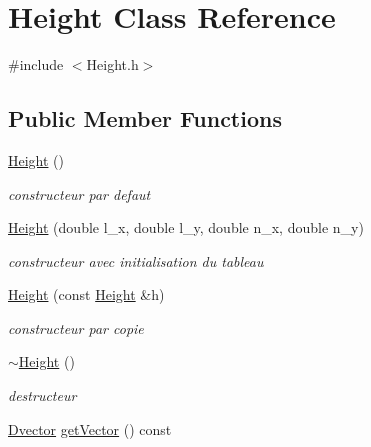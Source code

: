 \hypertarget{classHeight}{\section{Height Class Reference}
\label{classHeight}
}


{\ttfamily \#include $<$Height.\-h$>$}

\subsection*{Public Member Functions}
\begin{DoxyCompactItemize}
\item 
\hypertarget{classHeight_a7fecf5018a116f8234513b222bae6a2f}{\hyperlink{classHeight_a7fecf5018a116f8234513b222bae6a2f}{Height} ()}\label{classHeight_a7fecf5018a116f8234513b222bae6a2f}

\begin{DoxyCompactList}\small\item\em constructeur par defaut \end{DoxyCompactList}\item 
\hyperlink{classHeight_afef85fd5b8127c4bb4f27e05a4c869fe}{Height} (double l\-\_\-x, double l\-\_\-y, double n\-\_\-x, double n\-\_\-y)
\begin{DoxyCompactList}\small\item\em constructeur avec initialisation du tableau \end{DoxyCompactList}\item 
\hyperlink{classHeight_a2a357c8260db561016f559851ba3b831}{Height} (const \hyperlink{classHeight}{Height} \&h)
\begin{DoxyCompactList}\small\item\em constructeur par copie \end{DoxyCompactList}\item 
\hypertarget{classHeight_a93e56f89aa752196cc73ef5be717f386}{\hyperlink{classHeight_a93e56f89aa752196cc73ef5be717f386}{$\sim$\-Height} ()}\label{classHeight_a93e56f89aa752196cc73ef5be717f386}

\begin{DoxyCompactList}\small\item\em destructeur \end{DoxyCompactList}\item 
\hypertarget{classHeight_ac6ea0710f17f06938ea23aac943769b0}{\hyperlink{classDvector}{Dvector} \hyperlink{classHeight_ac6ea0710f17f06938ea23aac943769b0}{get\-Vector} () const }\label{classHeight_ac6ea0710f17f06938ea23aac943769b0}


\end{DoxyCompactItemize}
